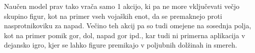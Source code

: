 \documentclass[a4paper, 12pt]{book}
\begin{document}
Naučen model prav tako vrača samo 1 akcijo, ki pa ne more vključevati večjo skupino figur, kot na primer vseh vojaških enot, da se premaknejo proti nasprotnikoviku za napad.
Večino teh akcij pa so tudi omejene na sosednja polja, kot na primer pomik gor, dol, napad gor ipd., kar tudi ni primerna aplikacija v dejansko igro, kjer se lahko figure premikajo v poljubnih dolžinah in smereh.
\end{document}

